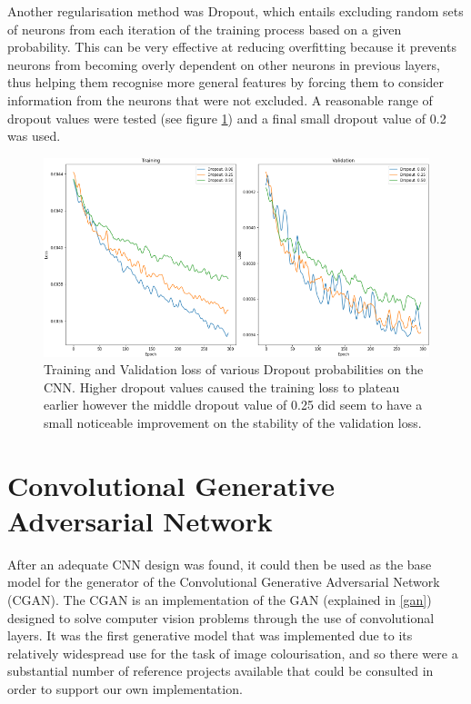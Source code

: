 \documentclass{l4proj}
\begin{document}
Another regularisation method was Dropout, which entails excluding random sets of neurons from each iteration of the training process based on a given probability. This can be very effective at reducing overfitting because it prevents neurons from becoming overly dependent on other neurons in previous layers, thus helping them recognise more general features by forcing them to consider information from the neurons that were not excluded. A reasonable range of dropout values were tested (see figure \ref{fig:dropout}) and a final small dropout value of 0.2 was used.
\begin{figure}[H]
    \centering
    \includegraphics[width=0.9\linewidth]{images/Dropout.png}    

    \caption{Training and Validation loss of various Dropout probabilities on the CNN. Higher dropout values caused the training loss to plateau earlier however the middle dropout value of 0.25 did seem to have a small noticeable improvement on the stability of the validation loss.}

    \label{fig:dropout} 
\end{figure}

\section{Convolutional Generative Adversarial Network}
\label{gan-implementation}
After an adequate CNN design was found, it could then be used as the base model for the generator of the Convolutional Generative Adversarial Network (CGAN). The CGAN is an implementation of the GAN (explained in \ref{gan}) designed to solve computer vision problems through the use of convolutional layers. It was the first generative model that was implemented due to its relatively widespread use for the task of image colourisation, and so there were a substantial number of reference projects available that could be consulted in order to support our own implementation.
\end{document}
